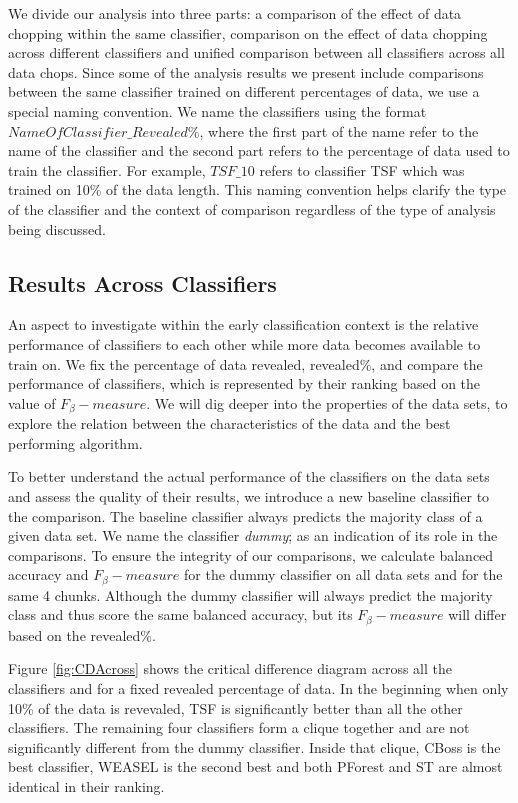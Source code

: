 We divide our analysis into three parts: a comparison of the effect of data chopping within the same classifier,
comparison on the effect of data chopping across different classifiers and unified comparison between all classifiers
across all data chops.
Since some of the analysis results we present include comparisons between the same classifier trained on different percentages of data, we use a special naming convention.
We name the classifiers using the format $NameOfClassifier\_Revealed\%$, where the first part of the name refer to the name of the classifier
and the second part refers to the percentage of data used to train the classifier. For example, $TSF\_10$ refers to classifier TSF which was trained on 10\% of the data length.
This naming convention helps clarify the type of the classifier and the context of comparison regardless of the type of analysis being discussed.


\subsection{Results Across Classifiers}
\label{SubsectionAcrossComparison}
An aspect to investigate within the early classification context is the relative performance of classifiers to each other while more data becomes available to train on.
We fix the percentage of data revealed, revealed\%, and compare the performance of classifiers, which is represented by their ranking based on the value of $F_{\beta}-measure$.
We will dig deeper into the properties of the data sets, to explore the relation between the characteristics of the data and the best performing algorithm.

To better understand the actual performance of the classifiers on the data sets and assess the quality of their results, we introduce a new baseline classifier to the comparison.
The baseline classifier always predicts the majority class of a given data set.
We name the classifier \emph{dummy}; as an indication of its role in the comparisons.
To ensure the integrity of our comparisons, we calculate balanced accuracy and $F_{\beta}-measure$ for the dummy classifier on all data sets and for the same 4 chunks.
Although the dummy classifier will always predict the majority class and thus score the same balanced accuracy, but its $F_{\beta}-measure$ will differ based on the revealed\%.

Figure \ref{fig:CDAcross} shows the critical difference diagram across all the classifiers and for a fixed revealed percentage of data.
In the beginning when only 10\% of the data is revevaled, TSF is significantly better than all the other classifiers.
The remaining four classifiers form a clique together and are not significantly different from the dummy classifier.
Inside that clique, CBoss is the best classifier, WEASEL is the second best and both PForest and ST are almost identical in their ranking.


